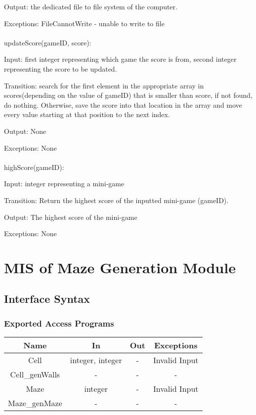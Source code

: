 \documentclass[12pt, titlepage]{article}
\begin{document}
		Output: the dedicated file to file system of the computer.
		
		Exceptions: FileCannotWrite - unable to write to file\\
		\\
		updateScore(gameID, score):
		
		Input: first integer representing which game the score is from, second integer representing the score to be updated.
		
		Transition: search for the first element in the appropriate array in scores(depending on the value of gameID) that is smaller than score, if not found, do nothing. Otherwise, save the score into that location in the array and move every value starting at that position to the next index.
		
		Output: None
		
		Exceptions: None\\
		\\
		highScore(gameID):
		
		Input: integer representing a mini-game
		
		Transition: Return the highest score of the inputted mini-game (gameID).
		
		Output: The highest score of the mini-game
		
		Exceptions: None
	
	
	
\section{MIS of Maze Generation Module}
		\subsection{Interface Syntax}
		\subsubsection{Exported Access Programs}
		\begin{tabular}[pos]{|c|c|c|c|}
			\hline
			\textbf{Name}& \textbf{In} & \textbf{Out} & \textbf{Exceptions} \\ \hline
			Cell & integer, integer & - & Invalid Input \\ \hline
			Cell\_genWalls & - & - & - \\ \hline
			Maze & integer & - & Invalid Input \\ \hline
			Maze\_genMaze & - & - & - \\ \hline
		\end{tabular}
		
\end{document}
